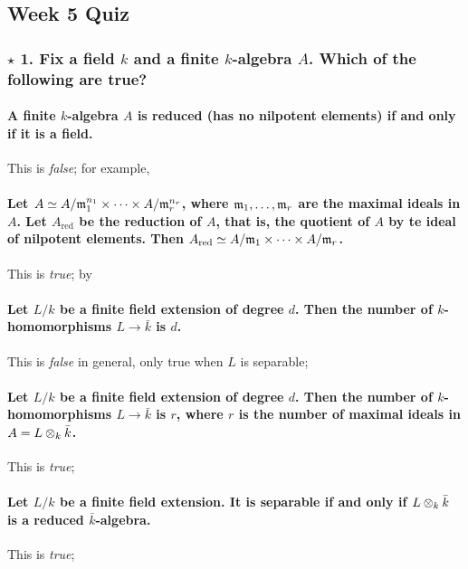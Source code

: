 \subsection[Quiz]{Week 5 Quiz}

\subsubsection*{$\star$ 1. Fix a field $k$ and a finite $k$-algebra $A$. Which of the following are true?}

\paragraph*{A finite $k$-algebra $A$ is reduced (has no nilpotent elements) if and only if it is a field.} This is \emph{false}; for example, %

\paragraph*{Let $A \simeq A / \mathfrak{m}_1^{n_1} \times \dotsb \times A / \mathfrak{m}_r^{n_r}$, where $\mathfrak{m}_1,\dotsc,\mathfrak{m}_r$ are the maximal ideals in $A$. Let $A_{\mathrm{red}}$ be the reduction of $A$, that is, the quotient of $A$ by te ideal of nilpotent elements. Then $A_{\mathrm{red}} \simeq A / \mathfrak{m}_1 \times \dotsb \times A / \mathfrak{m}_r$.} This is \emph{true}; by %

\paragraph*{Let $L / k$ be a finite field extension of degree $d$. Then the number of $k$-homomorphisms $L \to \bar{k}$ is $d$.} This is \emph{false} in general, only true when $L$ is separable; %

\paragraph*{Let $L / k$ be a finite field extension of degree $d$. Then the number of $k$-homomorphisms $L \to \bar{k}$ is $r$, where $r$ is the number of maximal ideals in $A = L \otimes_{k} \bar{k}$.} This is \emph{true}; %

\paragraph*{Let $L / k$ be a finite field extension. It is separable if and only if $L \otimes_{k} \bar{k}$ is a reduced $\bar{k}$-algebra.} This is \emph{true}; %

